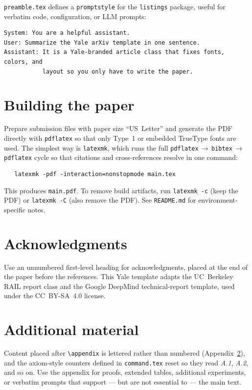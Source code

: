 \documentclass[11pt,letterpaper,logo]{yalearxiv}
\begin{document}
\verb+preamble.tex+ defines a \verb+promptstyle+ for the \verb+listings+ package,
useful for verbatim code, configuration, or LLM prompts:

\begin{lstlisting}[style=promptstyle]
System: You are a helpful assistant.
User: Summarize the Yale arXiv template in one sentence.
Assistant: It is a Yale-branded article class that fixes fonts, colors, and
           layout so you only have to write the paper.
\end{lstlisting}


\section{Building the paper}
\label{sec:building}

Prepare submission files with paper size ``US~Letter'' and generate the PDF
directly with \verb+pdflatex+ so that only Type~1 or embedded TrueType fonts are
used. The simplest way is \verb+latexmk+, which runs the full
\verb+pdflatex+\,$\rightarrow$\,\verb+bibtex+\,$\rightarrow$\,\verb+pdflatex+ cycle
so that citations and cross-references resolve in one command:
\begin{verbatim}
   latexmk -pdf -interaction=nonstopmode main.tex
\end{verbatim}
This produces \verb+main.pdf+. To remove build artifacts, run
\verb+latexmk -c+ (keep the PDF) or \verb+latexmk -C+ (also remove the PDF). See
\verb+README.md+ for environment-specific notes.


\section*{Acknowledgments}

Use an unnumbered first-level heading for acknowledgments, placed at the end of
the paper before the references. This Yale template adapts the UC~Berkeley RAIL
report class and the Google DeepMind technical-report template, used under the
CC~BY-SA~4.0 license.






\appendix
\section{Additional material}
\label{app:extra}

Content placed after \verb+\appendix+ is lettered rather than numbered
(Appendix~\ref{app:extra}), and the axiom-style counters defined in
\verb+command.tex+ reset so they read \textit{A.1}, \textit{A.2}, and so on. Use
the appendix for proofs, extended tables, additional experiments, or verbatim
prompts that support --- but are not essential to --- the main text.
\end{document}
